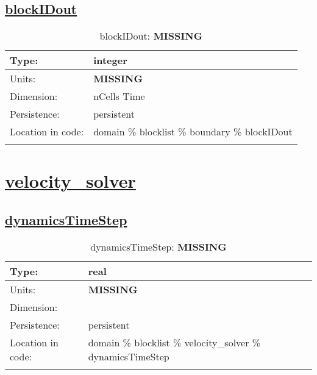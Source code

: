 \subsection[blockIDout]{\hyperref[sec:var_tab_boundary]{blockIDout}}
\label{subsec:var_sec_boundary_blockIDout}
\begin{center}
\begin{longtable}{| p{2.0in} | p{4.0in} |}
        \hline 
        Type: & integer \\
        \hline 
        Units: & {\bf \color{red} MISSING} \\
        \hline 
        Dimension: & nCells Time \\
        \hline 
        Persistence: & persistent \\
        \hline 
         Location in code: & domain \% blocklist \% boundary \% blockIDout \\
         \hline 
    \caption{blockIDout: {\bf \color{red} MISSING}}
\end{longtable}
\end{center}
\section[velocity\_solver]{\hyperref[sec:var_tab_velocity_solver]{velocity\_solver}}
\label{sec:var_sec_velocity_solver}
\subsection[dynamicsTimeStep]{\hyperref[sec:var_tab_velocity_solver]{dynamicsTimeStep}}
\label{subsec:var_sec_velocity_solver_dynamicsTimeStep}
\begin{center}
\begin{longtable}{| p{2.0in} | p{4.0in} |}
        \hline 
        Type: & real \\
        \hline 
        Units: & {\bf \color{red} MISSING} \\
        \hline 
        Dimension: &  \\
        \hline 
        Persistence: & persistent \\
        \hline 
         Location in code: & domain \% blocklist \% velocity\_solver \% dynamicsTimeStep \\
         \hline 
    \caption{dynamicsTimeStep: {\bf \color{red} MISSING}}
\end{longtable}
\end{center}
